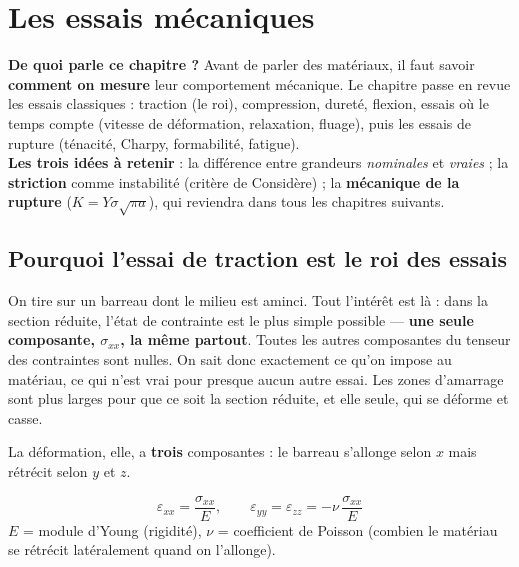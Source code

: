 \chapter{Les essais mécaniques}

\begin{rembox}[title=En bref]
\textbf{De quoi parle ce chapitre ?} Avant de parler des matériaux, il faut savoir
\textbf{comment on mesure} leur comportement mécanique. Le chapitre passe en revue les essais
classiques : traction (le roi), compression, dureté, flexion, essais où le temps compte
(vitesse de déformation, relaxation, fluage), puis les essais de rupture (ténacité, Charpy,
formabilité, fatigue). \\
\textbf{Les trois idées à retenir} : la différence entre grandeurs \emph{nominales} et
\emph{vraies} ; la \textbf{striction} comme instabilité (critère de Considère) ; la
\textbf{mécanique de la rupture} ($K = Y\sigma\sqrt{\pi a}$), qui reviendra dans tous les
chapitres suivants.
\end{rembox}

\section{Pourquoi l'essai de traction est le roi des essais}


On tire sur un barreau dont le milieu est aminci. Tout l'intérêt est là : dans la section
réduite, l'état de contrainte est le plus simple possible --- \textbf{une seule composante,
$\sigma_{xx}$, la même partout}. Toutes les autres composantes du tenseur des contraintes sont
nulles. On sait donc exactement ce qu'on impose au matériau, ce qui n'est vrai pour presque
aucun autre essai. Les zones d'amarrage sont plus larges pour que ce soit la section réduite,
et elle seule, qui se déforme et casse.

La déformation, elle, a \textbf{trois} composantes : le barreau s'allonge selon $x$ mais
rétrécit selon $y$ et $z$.

\begin{thmbox}[title=Élasticité linéaire isotrope en traction]
\[ \varepsilon_{xx} = \frac{\sigma_{xx}}{E}, \qquad
   \varepsilon_{yy} = \varepsilon_{zz} = -\nu\,\frac{\sigma_{xx}}{E} \]
$E$ = module d'Young (rigidité), $\nu$ = coefficient de Poisson (combien le matériau se
rétrécit latéralement quand on l'allonge).
\end{thmbox}

